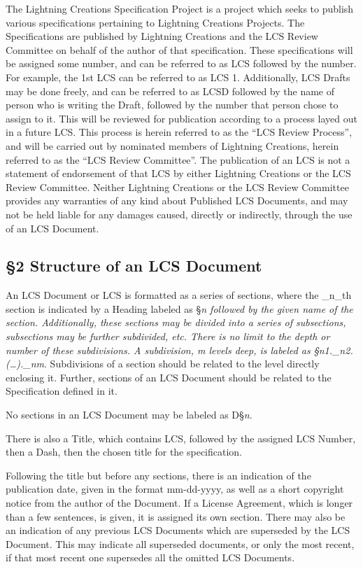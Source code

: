 \documentclass[
]{article}
\begin{document}
The Lightning Creations Specification Project is a project which seeks
to publish various specifications pertaining to Lightning Creations
Projects. The Specifications are published by Lightning Creations and
the LCS Review Committee on behalf of the author of that specification.
These specifications will be assigned some number, and can be referred
to as LCS followed by the number. For example, the 1st LCS can be
referred to as LCS 1. Additionally, LCS Drafts may be done freely, and
can be referred to as LCSD followed by the name of person who is writing
the Draft, followed by the number that person chose to assign to it.
This will be reviewed for publication according to a process layed out
in a future LCS. This process is herein referred to as the ``LCS Review
Process'', and will be carried out by nominated members of Lightning
Creations, herein referred to as the ``LCS Review Committee''. The
publication of an LCS is not a statement of endorsement of that LCS by
either Lightning Creations or the LCS Review Committee. Neither
Lightning Creations or the LCS Review Committee provides any warranties
of any kind about Published LCS Documents, and may not be held liable
for any damages caused, directly or indirectly, through the use of an
LCS Document.

\hypertarget{structure-of-an-lcs-document}{%
\subsection{§2 Structure of an LCS
Document}\label{structure-of-an-lcs-document}}

An LCS Document or LCS is formatted as a series of sections, where the
\_n\_th section is indicated by a Heading labeled as §\emph{n
\emph{followed by the given name of the section. Additionally, these
sections may be divided into a series of subsections, subsections may be
further subdivided, etc. There is no limit to the depth or number of
these subdivisions. A subdivision, m levels deep, is labeled as
§\emph{n1}.\_n2}.(\ldots).\_nm}. Subdivisions of a section should be
related to the level directly enclosing it. Further, sections of an LCS
Document should be related to the Specification defined in it.

No sections in an LCS Document may be labeled as D§\emph{n}.

There is also a Title, which contains LCS, followed by the assigned LCS
Number, then a Dash, then the chosen title for the specification.

Following the title but before any sections, there is an indication of
the publication date, given in the format mm-dd-yyyy, as well as a short
copyright notice from the author of the Document. If a License
Agreement, which is longer than a few sentences, is given, it is
assigned its own section. There may also be an indication of any
previous LCS Documents which are superseded by the LCS Document. This
may indicate all superseded documents, or only the most recent, if that
most recent one supersedes all the omitted LCS Documents.
\end{document}

